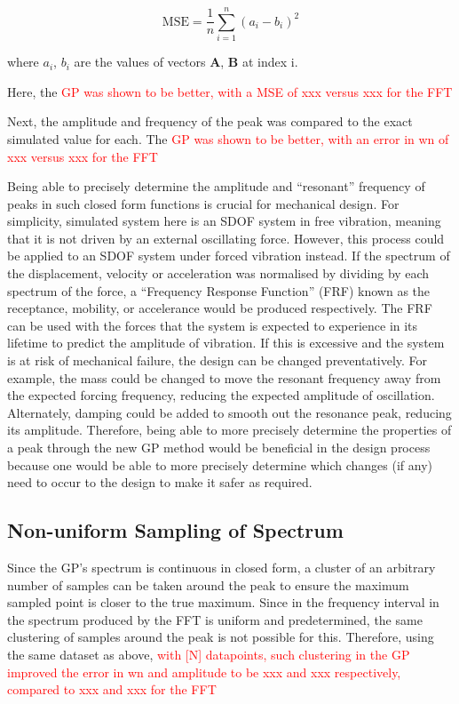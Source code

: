 \documentclass[12pt]{article}
\begin{document}
    \begin{equation}
        \text{MSE} = \frac{1}{n} \sum_{i=1}^{n} (a_i - b_i)^2
        \label{eq:mse}
    \end{equation}

    \noindent where $a_i$, $b_i$ are the values of vectors $\mathbf{A}$, $\mathbf{B}$ at index i.

    Here, the \textcolor{red}{GP was shown to be better, with a MSE of xxx versus xxx for the FFT}

    Next, the amplitude and frequency of the peak was compared to the exact simulated value for each.
    The \textcolor{red}{GP was shown to be better, with an error in wn of xxx versus xxx for the FFT}

    Being able to precisely determine the amplitude and ``resonant'' frequency of peaks in such closed form functions is crucial for mechanical design.
    For simplicity, simulated system here is an SDOF system in free vibration, meaning that it is not driven by an external oscillating force.
    However, this process could be applied to an SDOF system under forced vibration instead.
    If the spectrum of the displacement, velocity or acceleration was normalised by dividing by each spectrum of the force, a ``Frequency Response Function'' (FRF) known as the receptance, mobility, or accelerance would be produced respectively.
    The FRF can be used with the forces that the system is expected to experience in its lifetime to predict the amplitude of vibration.
    If this is excessive and the system is at risk of mechanical failure, the design can be changed preventatively.
    For example, the mass could be changed to move the resonant frequency away from the expected forcing frequency, reducing the expected amplitude of oscillation.
    Alternately, damping could be added to smooth out the resonance peak, reducing its amplitude.
    Therefore, being able to more precisely determine the properties of a peak through the new GP method would be beneficial in the design process because one would be able to more precisely determine which changes (if any) need to occur to the design to make it safer as required.

    \subsection{Non-uniform Sampling of Spectrum}
    Since the GP's spectrum is continuous in closed form, a cluster of an arbitrary number of samples can be taken around the peak to ensure the maximum sampled point is closer to the true maximum.
    Since in the frequency interval in the spectrum produced by the FFT is uniform and predetermined, the same clustering of samples around the peak is not possible for this.
    Therefore, using the same dataset as above, \textcolor{red}{ with [N] datapoints, such clustering in the GP improved the error in wn and amplitude to be xxx and xxx respectively, compared to xxx and xxx for the FFT}
\end{document}

